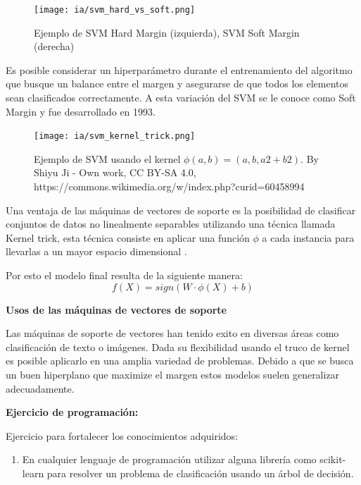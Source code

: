 \documentclass[11pt,fleqn]{book} %
\begin{document}
\begin{figure}[ht]
\centering\texttt{[image: ia/svm\_hard\_vs\_soft.png]}
\caption{Ejemplo de SVM Hard Margin (izquierda), SVM Soft Margin (derecha)}
\end{figure}

Es posible considerar un hiperparámetro durante el entrenamiento del algoritmo que busque un balance entre el margen y asegurarse de que todos los elementos sean clasificados correctamente. A esta variación del SVM se le conoce como Soft Margin y fue desarrollado en 1993.

\begin{figure}[ht]
\centering\texttt{[image: ia/svm\_kernel\_trick.png]}
\caption{Ejemplo de SVM usando el kernel $\phi(a, b) = (a, b, a2 + b2)$. By Shiyu Ji - Own work, CC BY-SA 4.0, https://commons.wikimedia.org/w/index.php?curid=60458994}

\label{fig:svm_kernel_trick}
\end{figure}

Una ventaja de las máquinas de vectores de soporte es la posibilidad de clasificar conjuntos de datos no linealmente separables utilizando una técnica llamada Kernel trick, esta técnica consiste en aplicar una función $\phi$ a cada instancia para llevarlas a un mayor espacio dimensional \cite{boswell2002introduction}.

Por esto el modelo final resulta de la siguiente manera:
\begin{equation}
\label{eqn:svm_basic}
f(X) = sign(W \cdot  \phi(X) + b)
\end{equation}

\textbf{Usos de las máquinas de vectores de soporte}

Las máquinas de soporte de vectores han tenido exito en diversas áreas como clasificación de texto o imágenes. Dada su flexibilidad usando el truco de kernel es posible aplicarlo en una amplia variedad de problemas. Debido a que se busca un buen hiperplano que maximize el margen estos modelos suelen generalizar adecuadamente.

\textbf{Ejercicio de programación:}

Ejercicio para fortalecer los conocimientos adquiridos:

\begin{enumerate}
\item En cualquier lenguaje de programación utilizar alguna librería como scikit-learn para resolver un problema de clasificación usando un árbol de decisión.
\end{enumerate}
\end{document}
